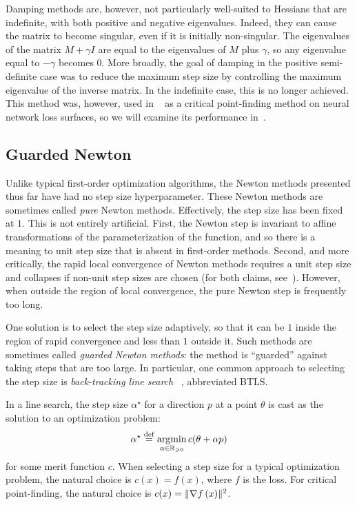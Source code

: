 \documentclass[../../thesis.tex]{subfiles}
\begin{document}
Damping methods are, however,
not particularly well-suited to Hessians that are indefinite,
with both positive and negative eigenvalues.
Indeed, they can cause the matrix to become singular,
even if it is initially non-singular.
The eigenvalues of the matrix $M + \gamma I$
are equal to the eigenvalues of $M$ plus $\gamma$,
so any eigenvalue equal to $-\gamma$ becomes $0$.
More broadly,
the goal of damping in the positive semi-definite case
was to reduce the maximum step size by controlling
the maximum eigenvalue of the inverse matrix.
In the indefinite case, this is no longer achieved.
This method was, however, used in%
~\cite{dauphin2014}
as a critical point-finding method
on neural network loss surfaces,
so we will examine its performance in~.

\subsection{Guarded Newton}

Unlike typical first-order optimization algorithms,
the Newton methods presented thus far have had no step size hyperparameter.
These Newton methods are sometimes called \emph{pure} Newton methods.
Effectively, the step size has been fixed at $1$.
This is not entirely artificial.
First, the Newton step is invariant to affine transformations
of the parameterization of the function,
and so there is a meaning to unit step size
that is absent in first-order methods.
Second, and more critically,
the rapid local convergence of Newton methods
requires a unit step size
and collapses if non-unit step sizes are chosen
(for both claims, see~\cite{boyd2004,nocedal2006,roosta2018}).
However, when outside the region
of local convergence,
the pure Newton step is frequently too long.

One solution is to select the step size adaptively,
so that it can be $1$ inside the region of rapid convergence
and less than $1$ outside it.
Such methods are sometimes called \emph{guarded Newton methods}:
the method is \enquote{guarded} against taking steps that are too large.
In particular, one common approach to selecting the step size
is \emph{back-tracking line search}%
~\cite{armijo1966},
abbreviated BTLS.\@

In a line search, the step size $\alpha^\star{}$
for a direction $p$ at a point $\theta$
is cast as the solution to an optimization problem:
\begin{equation}
	\alpha^\star{}
	\stackrel{\small \mathrm{def}}{=} \mathop{\mathrm{argmin}}_{\alpha \in \mathbb{R}_{\geqslant 0}} c(\theta + \alpha p)
\end{equation}
\noindent for some merit function $c$.
When selecting a step size for a typical optimization problem,
the natural choice is $c(x) = f(x)$, where $f$ is the loss.
For critical point-finding,
the natural choice is $c(x) = \lVert\nabla f\left(x\right)\rVert^2$.
\end{document}
